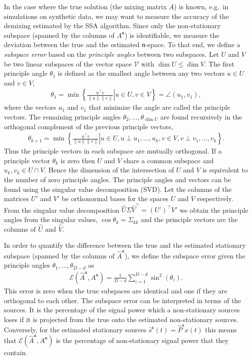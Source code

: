 \documentclass{article}
\newcommand{\1}{\ensuremath{\mathds{1}}}
\newcommand{\s}{\ensuremath{\mathfrak{s}}}
\newcommand{\n}{\ensuremath{\mathfrak{n}}}
\newcommand{\0}{\ensuremath{0}}
\begin{document}
\begin{appendices}
In the case where the true solution (the mixing matrix $A$) is known, e.g.~in simulations 
on synthetic data, we may want to measure the accuracy of the demixing estimated by the 
SSA algorithm. Since only the non-stationary subspace (spanned 
by the columns of $A^\n$) is identifiable, we measure the deviation between the true and the
estimated \n-space. To that end, we define a \textit{subspace error} based on the 
\textit{principle angles} between two subspaces. Let $U$ and $V$ be two linear subspaces of the 
vector space $\mathcal{V}$ with $\dim U \leq \dim V$. The first principle angle $\theta_1$ is 
defined as the smallest angle between any two vectors $u \in U$ and $v \in V$, 
\begin{align*}
	\theta_1 = \min \left. \left\{ \frac{ u^\top v }{ \| u \| \| v \| } \right| u \in U, v \in V \right\} = \angle(u_1, v_1),
\end{align*}
where the vectors $u_1$ and $v_1$ that minimize the angle are called the principle vectors.
The remaining principle angles $\theta_2, \ldots, \theta_{\dim U}$ are found recursively in the orthogonal 
complement of the previous principle vectors, 
\begin{align*}
	\theta_{k+1} = \min \left. \left\{ \frac{ u^\top v }{ \| u \| \| v \| } \right| u \in U, u \perp u_1, \ldots, u_k , 
			v \in V, v \perp v_1, \ldots, v_k \right\} . 
\end{align*}
Thus the principle vectors in each subspace are mutually orthogonal. If a principle vector $\theta_k$ is zero 
then $U$ and $V$ share a common subspace and $u_k,v_k \in U \cap V$. Hence the dimension of the intersection
of $U$ and $V$ is equivalent to the number of zero principle angles. The principle angles and vectors
can be found using the singular value decomposition (SVD). Let the columns of the matrices $U'$ and $V'$ be 
orthonormal bases for the spaces $U$ and $V$ respectively. From the singular value decomposition 
$\hat{U} \Sigma \hat{V}^\top = (U')^\top V'$ we obtain the principle angles from the singular values, 
$\cos \theta_k = \Sigma_{kk}$ and the principle vectors are the columns of $\hat{U}$ and $\hat{V}$. 

In order to quantify the difference between the true and the estimated stationary subspace 
(spanned by the columns of $\hat{A}^\n$), we define the subspace error given the principle 
angles $\theta_1, \ldots, \theta_{D-d}$ as 
\begin{align*}
	\mathcal{E}(\hat{A}^\n , A^\n ) = \frac{1}{D-d} \sum_{i=1}^{D-d} \sin^2 (\theta_i) .
\end{align*}
This error is zero when the true subspaces are identical and one if they are orthogonal to 
each other. The subspace error can be interpreted in terms of the sources. It is the 
percentage of the signal power which a non-stationary sources loses if it is projected 
from the true onto the estimated non-stationary sources. Conversely, for the estimated stationary
sources $\hat{s}^\s(t) = \hat{P}^\s x(t)$ this means that $\mathcal{E}(\hat{A}^\n , A^\n )$ 
is the percentage of non-stationary signal power that they contain. 


\end{appendices}
\end{document}
